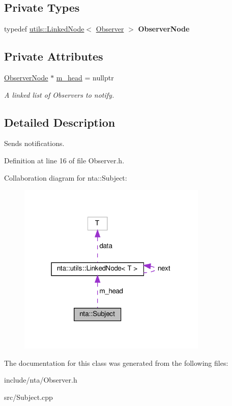 \subsection*{Private Types}
\begin{DoxyCompactItemize}
\item 
\mbox{\label{classnta_1_1Subject_a7c677f3b882eb4c8204202e9c9ed9e0e}} 
typedef \hyperlink{structnta_1_1utils_1_1LinkedNode}{utils\+::\+Linked\+Node}$<$ \hyperlink{classnta_1_1Observer}{Observer} $>$ {\bfseries Observer\+Node}
\end{DoxyCompactItemize}
\subsection*{Private Attributes}
\begin{DoxyCompactItemize}
\item 
\mbox{\label{classnta_1_1Subject_a7049999f4dcfbaa6ce6af23a98ff2027}} 
\hyperlink{structnta_1_1utils_1_1LinkedNode}{Observer\+Node} $\ast$ \hyperlink{classnta_1_1Subject_a7049999f4dcfbaa6ce6af23a98ff2027}{m\+\_\+head} = nullptr
\begin{DoxyCompactList}\small\item\em A linked list of Observers to notify. \end{DoxyCompactList}\end{DoxyCompactItemize}


\subsection{Detailed Description}
Sends notifications. 

Definition at line 16 of file Observer.\+h.



Collaboration diagram for nta\+:\+:Subject\+:\nopagebreak
\begin{figure}[H]
\begin{center}
\leavevmode
\includegraphics[width=256pt]{d5/d37/classnta_1_1Subject__coll__graph}
\end{center}
\end{figure}


The documentation for this class was generated from the following files\+:\begin{DoxyCompactItemize}
\item 
include/nta/Observer.\+h\item 
src/Subject.\+cpp\end{DoxyCompactItemize}
